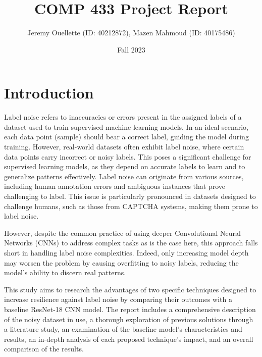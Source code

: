 \documentclass[11pt,twocolumn,letterpaper]{article}
\title{COMP 433 Project Report}
\author{Jeremy Ouellette (ID: 40212872), Mazen Mahmoud (ID: 40175486)}
\date{Fall 2023}
\begin{document}
\maketitle

\section{Introduction}
Label noise refers to inaccuracies or errors present in the assigned labels of a dataset used to train supervised machine learning models. In an ideal scenario, each data point (sample) should bear a correct label, guiding the model during training. However, real-world datasets often exhibit label noise, where certain data points carry incorrect or noisy labels. This poses a significant challenge for supervised learning models, as they depend on accurate labels to learn and to generalize patterns effectively. Label noise can originate from various sources, including human annotation errors and ambiguous instances that prove challenging to label. This issue is particularly pronounced in datasets designed to challenge humans, such as those from CAPTCHA systems, making them prone to label noise. 

However, despite the common practice of using deeper Convolutional Neural Networks (CNNs) to address complex tasks as is the case here, this approach falls short in handling label noise complexities. Indeed, only increasing model depth may worsen the problem by causing overfitting to noisy labels, reducing the model's ability to discern real patterns. 

This study aims to research the advantages of two specific techniques designed to increase resilience against label noise by comparing their outcomes with a baseline ResNet-18 CNN model. The report includes a comprehensive description of the noisy dataset in use, a thorough exploration of previous solutions through a literature study, an examination of the baseline model's characteristics and results, an in-depth analysis of each proposed technique's impact, and an overall comparison of the results.
\end{document}
